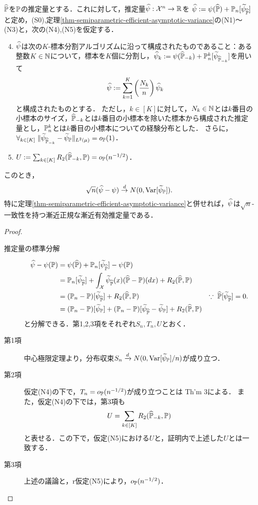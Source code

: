 \documentclass[uplatex, dvipdfmx]{jsarticle}
\begin{document}
\begin{theorem}\label{thm-semiparametric-one-step}
    $\widehat{\mathbb{P}}$を$\mathbb{P}$の推定量とする．これに対して，推定量$\widehat{\psi}:\mathcal{X}^n\to\mathbb{R}$を
    $\widehat{\psi}:=\psi(\widehat{\mathbb{P}})+\mathbb{P}_n[\widetilde{\psi}_{\widehat{\mathbb{P}}}]$と定め，(S0),定理\ref{thm-semiparametric-efficient-asymptotic-variance}の(N1)～(N3)と，次の(N4),(N5)を仮定する．
    \begin{enumerate}[({N}1)]\setcounter{enumi}{3}
        \item $\widehat{\psi}$は次の$K$-標本分割アルゴリズムに沿って構成されたものであること：ある整数$K\in\mathbb{N}$について，標本を$K$個に分割し，$\widehat{\psi}_k:=\psi(\widehat{\mathbb{P}}_{-k})+\mathbb{P}_n^k[\widetilde{\psi}_{\widehat{\mathbb{P}}_{-k}}]$を用いて
        \[\widehat{\psi}:=\sum^K_{k=1}\left(\frac{N_k}{n}\right)\widehat{\psi}_k\]
        と構成されたものとする．
        ただし，$k\in[K]$に対して，$N_k\in\mathbb{N}$とは$k$番目の小標本のサイズ，$\widehat{\mathbb{P}}_{-k}$とは$k$番目の小標本を除いた標本から構成された推定量とし，$\mathbb{P}_n^k$とは$k$番目の小標本についての経験分布とした．
        さらに，
        $\forall_{k\in[K]}\;\|\widetilde{\psi}_{\widehat{\mathbb{P}}_{-k}}-\widetilde{\psi}_{\mathbb{P}}\|_{L^2(\mu)}=o_{\mathbb{P}}(1)$．
        \item $U:=\sum_{k\in[K]}R_2(\widehat{\mathbb{P}}_{-k},\mathbb{P})=o_{\mathbb{P}}(n^{-1/2})$．
    \end{enumerate}
    このとき，
    \[\sqrt{n}(\widehat{\psi}-\psi)\overset{d}{\to} N(0,\mathrm{Var}[\widetilde{\psi}_{\mathbb{P}}]).\]
    特に定理\ref{thm-semiparametric-efficient-asymptotic-variance}と併せれば，$\widehat{\psi}$は$\sqrt{n}$-一致性を持つ漸近正規な漸近有効推定量である．
\end{theorem}
\begin{proof}\mbox{}
    \begin{description}
        \item[推定量の標準分解] \begin{align*}
            \widehat{\psi}-\psi(\mathbb{P})&=\psi(\widehat{\mathbb{P}})+\mathbb{P}_n[\widetilde{\psi}_{\widehat{\mathbb{P}}}]-\psi(\mathbb{P})\\
            &=\mathbb{P}_n[\widetilde{\psi}_{\widehat{\mathbb{P}}}]+\int_{\mathcal{X}}\widetilde{\psi}_{\widehat{\mathbb{P}}}(x)(\widehat{\mathbb{P}}-\mathbb{P})(dx)+R_2(\widehat{\mathbb{P}},\mathbb{P})\\
            &=(\mathbb{P}_n-\mathbb{P})[\widetilde{\psi}_{\widehat{\mathbb{P}}}]+R_2(\widehat{\mathbb{P}},\mathbb{P})&\because\;\widehat{\mathbb{P}}[\widetilde{\psi}_{\widehat{\mathbb{P}}}]=0.\\
            &=(\mathbb{P}_n-\mathbb{P})[\widetilde{\psi}_{\mathbb{P}}]+(\mathbb{P}_n-\mathbb{P})[\widetilde{\psi}_{\widehat{\mathbb{P}}}-\widetilde{\psi}_{\mathbb{P}}]+R_2(\widehat{\mathbb{P}},\mathbb{P})
        \end{align*}
        と分解できる．第1,2,3項をそれぞれ$S_n,T_n,U$とおく．
        \item[第1項] 中心極限定理より，分布収束$S_n\xrightarrow{d}N(0,\mathrm{Var}[\widetilde{\psi}_{\mathbb{P}}]/n)$が成り立つ．
        \item[第2項] 仮定(N4)の下で，$T_n=o_{\mathbb{P}}(n^{-1/2})$が成り立つことは\cite{Kennedy et al} Th'm 3による．
        また，仮定(N4)の下では，第3項も
        \[U=\sum_{k\in[K]}R_2(\widehat{\mathbb{P}}_{-k},\mathbb{P})\]
        と表せる．この下で，仮定(N5)における$U$と，証明内で上述した$U$とは一致する．
        \item[第3項] 上述の議論と，r仮定(N5)により，$o_{\mathbb{P}}(n^{-1/2})$．
    \end{description}
\end{proof}
\end{document}
